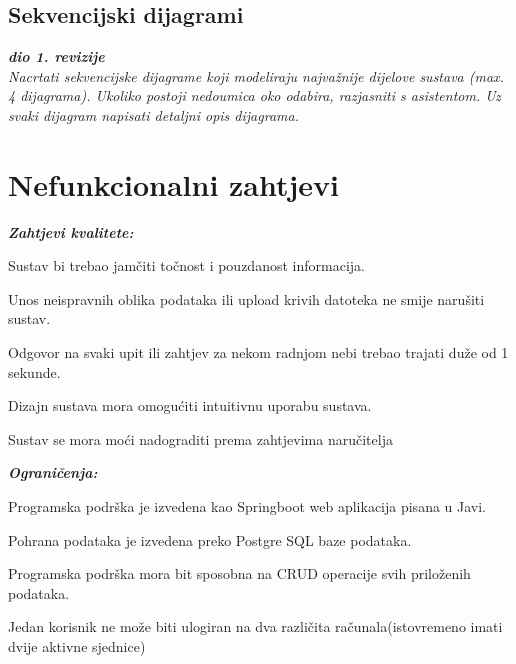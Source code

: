 			\subsection{Sekvencijski dijagrami}
				
				\textbf{\textit{dio 1. revizije}}\\
				
				\textit{Nacrtati sekvencijske dijagrame koji modeliraju najvažnije dijelove sustava (max. 4 dijagrama). Ukoliko postoji nedoumica oko odabira, razjasniti s asistentom. Uz svaki dijagram napisati detaljni opis dijagrama.}
				\eject
	
		\section{Nefunkcionalni zahtjevi}
		
		    	\textbf{\textit{Zahtjevi kvalitete:}}\\
		 
		\begin{packed_item}
	
						\item Sustav bi trebao jamčiti točnost i pouzdanost informacija.
						\item  Unos neispravnih oblika podataka ili upload krivih datoteka ne smije narušiti sustav.
						\item Odgovor na svaki upit ili zahtjev za nekom radnjom nebi trebao trajati duže od 1 sekunde.
						\item  Dizajn sustava mora omogućiti intuitivnu uporabu sustava.
						\item Sustav se mora moći nadograditi prema zahtjevima naručitelja
						
					\end{packed_item}
				
			 
	    	\textbf{\textit{Ograničenja:}}\\
		 
			\begin{packed_item}
	
						\item Programska podrška je izvedena kao Springboot web aplikacija pisana u Javi.
						\item  Pohrana podataka je izvedena preko Postgre SQL baze podataka.
						\item Programska podrška mora bit sposobna na CRUD operacije svih priloženih podataka.
						\item  Jedan korisnik ne može biti ulogiran na dva različita računala(istovremeno imati dvije aktivne sjednice)
						
					\end{packed_item}
			 
			 
			 
	